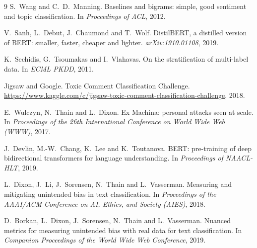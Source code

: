 \documentclass[11pt,a4paper]{article}
\begin{document}
\begin{thebibliography}{9}
  S.~Wang and C.~D.~Manning.
  Baselines and bigrams: simple, good sentiment and topic classification.
  In \emph{Proceedings of ACL}, 2012.

  V.~Sanh, L.~Debut, J.~Chaumond and T.~Wolf.
  DistilBERT, a distilled version of BERT: smaller, faster, cheaper and
  lighter.
  \emph{arXiv:1910.01108}, 2019.

  K.~Sechidis, G.~Tsoumakas and I.~Vlahavas.
  On the stratification of multi-label data.
  In \emph{ECML PKDD}, 2011.

  Jigsaw and Google.
  Toxic Comment Classification Challenge.
  \url{https://www.kaggle.com/c/jigsaw-toxic-comment-classification-challenge},
  2018.

  E.~Wulczyn, N.~Thain and L.~Dixon.
  Ex Machina: personal attacks seen at scale.
  In \emph{Proceedings of the 26th International Conference on World Wide
  Web (WWW)}, 2017.

  J.~Devlin, M.-W.~Chang, K.~Lee and K.~Toutanova.
  BERT: pre-training of deep bidirectional transformers for language
  understanding.
  In \emph{Proceedings of NAACL-HLT}, 2019.

  L.~Dixon, J.~Li, J.~Sorensen, N.~Thain and L.~Vasserman.
  Measuring and mitigating unintended bias in text classification.
  In \emph{Proceedings of the AAAI/ACM Conference on AI, Ethics, and Society
  (AIES)}, 2018.

  D.~Borkan, L.~Dixon, J.~Sorensen, N.~Thain and L.~Vasserman.
  Nuanced metrics for measuring unintended bias with real data for text
  classification.
  In \emph{Companion Proceedings of the World Wide Web Conference}, 2019.
\end{thebibliography}
\end{document}
